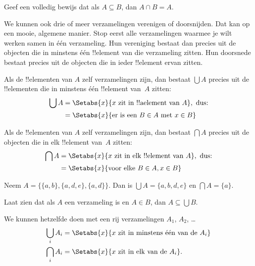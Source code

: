 \documentclass[openany]{memoir}
\begin{document}
\begin{prob}
Geef een volledig bewijs dat als $A \subseteq B$, dan $A \cap B = A$.
\end{prob}

\begin{explain}
We kunnen ook drie of meer verzamelingen verenigen of doorsnijden. Dat kan op
een mooie, algemene manier. Stop eerst alle verzamelingen waarmee je wilt
werken samen in één verzameling. Hun
vereniging bestaat dan precies uit de objecten die in minstens één
!!{element} van die verzameling zitten. Hun doorsnede bestaat precies uit de
objecten die in ieder !!{element} ervan zitten.
\end{explain}

\begin{defn}
Als de !!{element}en van $A$ zelf verzamelingen zijn, dan bestaat $\bigcup A$
precies uit de !!{element}en die in minstens één !!{element} van~$A$ zitten:
\begin{align*}
\bigcup A & = \Setabs{x}{x \text{ zit in !!a{element} van } A},
\text{ dus:}\\
& = \Setabs{x}{\text{er is een } B \in A
  \text{ met } x \in B}
\end{align*}
\end{defn}

\begin{defn}
Als de !!{element}en van $A$ zelf verzamelingen zijn, dan bestaat $\bigcap A$
precies uit de objecten die in elk !!{element} van~$A$ zitten:
\begin{align*}
\bigcap A & = \Setabs{x}{x \text{ zit in elk !!{element} van } A},
\text{ dus:}\\
 & = \Setabs{x}{\text{voor elke } B \in A, x \in B}
\end{align*}
\end{defn}

\begin{ex}
Neem $A = \{ \{ a, b \}, \{ a, d, e \}, \{ a, d \} \}$.
Dan is $\bigcup A = \{ a, b, d, e \}$ en $\bigcap A = \{ a \}$.
\end{ex}
\begin{prob}
	Laat zien dat als $A$ een verzameling is en $A \in B$, dan
	$A \subseteq \bigcup B$.
\end{prob}

We kunnen hetzelfde doen met een rij verzamelingen $A_1$, $A_2$, \dots
\begin{align*}
\bigcup_i A_i & = \Setabs{x}{x \text{ zit in minstens één van de } A_i}\\
\bigcap_i A_i & = \Setabs{x}{x \text{ zit in elk van de } A_i}.
\end{align*}
\end{document}
